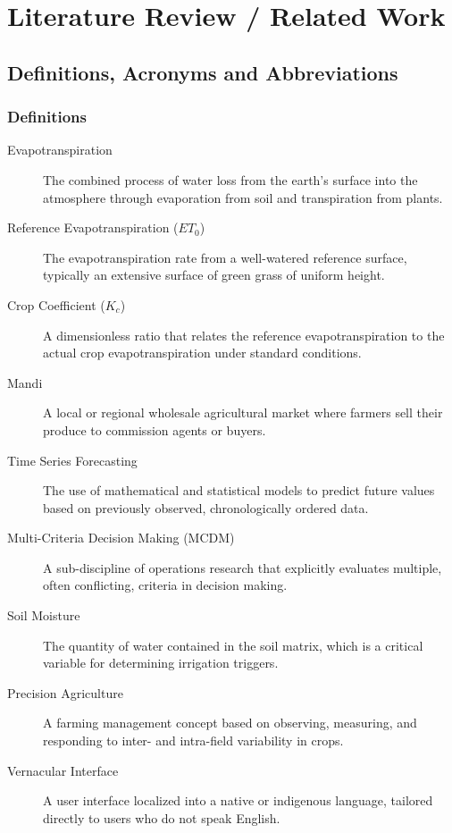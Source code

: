 \documentclass{FastFyp}
\begin{document}
\chapter{Literature Review / Related Work}

\section{Definitions, Acronyms and Abbreviations}

\subsection{Definitions}
\begin{description}
    \item[Evapotranspiration] The combined process of water loss from the earth's surface into the atmosphere through evaporation from soil and transpiration from plants.
    \item[Reference Evapotranspiration ($ET_0$)] The evapotranspiration rate from a well-watered reference surface, typically an extensive surface of green grass of uniform height.
    \item[Crop Coefficient ($K_c$)] A dimensionless ratio that relates the reference evapotranspiration to the actual crop evapotranspiration under standard conditions.
    \item[Mandi] A local or regional wholesale agricultural market where farmers sell their produce to commission agents or buyers.
    \item[Time Series Forecasting] The use of mathematical and statistical models to predict future values based on previously observed, chronologically ordered data.
    \item[Multi-Criteria Decision Making (MCDM)] A sub-discipline of operations research that explicitly evaluates multiple, often conflicting, criteria in decision making.
    \item[Soil Moisture] The quantity of water contained in the soil matrix, which is a critical variable for determining irrigation triggers.
    \item[Precision Agriculture] A farming management concept based on observing, measuring, and responding to inter- and intra-field variability in crops.
    \item[Vernacular Interface] A user interface localized into a native or indigenous language, tailored directly to users who do not speak English.
\end{description}
\end{document}
